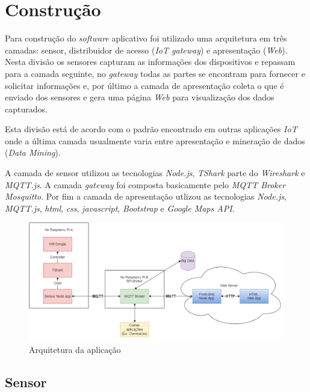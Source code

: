 \chapter{Construção}
\label{chap:Construcao}

Para construção do \emph{software} aplicativo foi utilizado uma arquitetura em
três camadas: sensor, distribuidor de acesso (\emph{IoT gateway}) e apresentação
(\emph{Web}). Nesta divisão os sensores capturam as informações dos dispositivos
e repassam para a camada seguinte, no \emph{gateway} todas as partes se
encontram para fornecer e solicitar informações e, por último a camada de
apresentação coleta o que é enviado dos sensores e gera uma página \emph{Web}
para visualização dos dados capturados.

Esta divisão está de acordo com o padrão encontrado em outras aplicações
\emph{IoT} onde a última camada usualmente varia entre apresentação e mineração
de dados (\emph{Data Mining}).

A camada de sensor utilizou as tecnologias \emph{Node.js}, \emph{TShark} parte
do \emph{Wireshark} e \emph{MQTT.js}. A camada \emph{gateway} foi composta
basicamente pelo \emph{MQTT Broker} \emph{Mosquitto}. Por fim a camada de
apresentação utlizou as tecnologias \emph{Node.js}, \emph{MQTT.js}, \emph{html},
\emph{css}, \emph{javascript}, \emph{Bootstrap} e \emph{Google Maps API}.

\begin{figure}[htb]
	\caption{\label{fig-arq-app}Arquitetura da aplicação}
	\begin{center}
		\includegraphics[width=1\textwidth]{050-construcao/esquema-proj.png}
	\end{center}
\end{figure}


\section{Sensor}
\label{sec:app-sensor}


